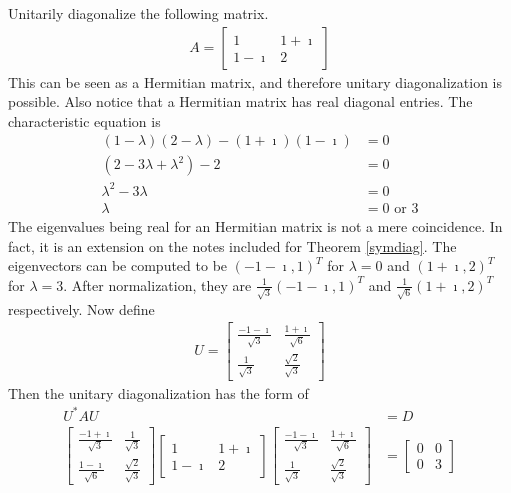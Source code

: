 \begin{exmp}
Unitarily diagonalize the following matrix.
\begin{align*}
A =
\begin{bmatrix}
1 & 1+\imath \\
1-\imath & 2
\end{bmatrix}
\end{align*}
This can be seen as a Hermitian matrix, and therefore unitary diagonalization is possible. Also notice that a Hermitian matrix has real diagonal entries. The characteristic equation is 
\begin{align*}
(1-\lambda)(2-\lambda) - (1+\imath)(1-\imath) &= 0 \\
(2 - 3\lambda + \lambda^2) - 2 &= 0 \\
\lambda^2 - 3\lambda &= 0 \\
\lambda &= 0 \text{ or } 3
\end{align*}
The eigenvalues being real for an Hermitian matrix is not a mere coincidence. In fact, it is an extension on the notes included for Theorem \ref{symdiag}. The eigenvectors can be computed to be $(-1-\imath, 1)^T$ for $\lambda = 0$ and $(1+\imath, 2)^T$ for $\lambda = 3$. After normalization, they are $\frac{1}{\sqrt{3}}(-1-\imath, 1)^T$ and $\frac{1}{\sqrt{6}}(1+\imath, 2)^T$ respectively. Now define
\begin{align*}
U =
\begin{bmatrix}
\frac{-1-\imath}{\sqrt{3}} & \frac{1+\imath}{\sqrt{6}} \\
\frac{1}{\sqrt{3}} & \frac{\sqrt{2}}{\sqrt{3}}
\end{bmatrix}
\end{align*}
Then the unitary diagonalization has the form of
\begin{align*}
U^* AU &= D \\
\begin{bmatrix}
\frac{-1+\imath}{\sqrt{3}} & \frac{1}{\sqrt{3}} \\
\frac{1-\imath}{\sqrt{6}} & \frac{\sqrt{2}}{\sqrt{3}}
\end{bmatrix}
\begin{bmatrix}
1 & 1+\imath \\
1-\imath & 2
\end{bmatrix}
\begin{bmatrix}
\frac{-1-\imath}{\sqrt{3}} & \frac{1+\imath}{\sqrt{6}} \\
\frac{1}{\sqrt{3}} & \frac{\sqrt{2}}{\sqrt{3}}
\end{bmatrix}
&=
\begin{bmatrix}
0 & 0 \\
0 & 3
\end{bmatrix}
\end{align*}
\end{exmp}

